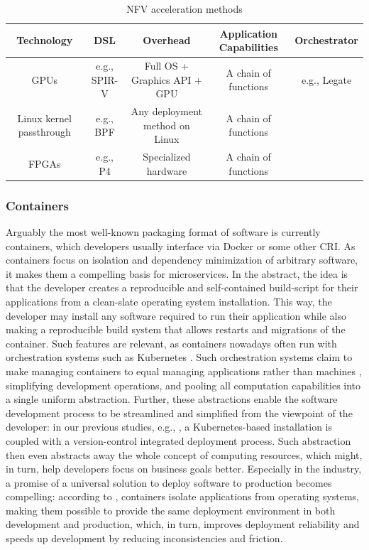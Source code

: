 \documentclass{IEEEtran}
\begin{document}
\begin{table}
\begin{center}
\caption{NFV acceleration methods}
\begin{tabular}{ c|c|c|c|c } 
 Technology & DSL & Overhead & Application Capabilities & Orchestrator \\
 \hline
 GPUs & e.g., SPIR-V & Full OS + Graphics API + GPU & A chain of functions & e.g., Legate \cite{bauer2019legate} \\
 Linux kernel passthrough & e.g., BPF & Any deployment method on Linux & A chain of functions &  \\
 FPGAs & e.g., P4 & Specialized hardware & A chain of functions & \\
\end{tabular}
\end{center}
\end{table}

\subsubsection{Containers}

Arguably the most well-known packaging format of software is currently containers, which developers usually interface via Docker or some other \gls{CRI}. As containers focus on isolation and dependency minimization of arbitrary software, it makes them a compelling basis for microservices. In the abstract, the idea is that the developer creates a reproducible and self-contained build-script for their applications from a clean-slate operating system installation. This way, the developer may install any software required to run their application while also making a reproducible build system that allows restarts and migrations of the container. Such features are relevant, as containers nowadays often run with orchestration systems such as Kubernetes \cite{burns2016borg}. Such orchestration systems claim to make managing containers to equal managing applications rather than machines \cite{burns2016borg}, simplifying development operations, and pooling all computation capabilities into a single uniform abstraction. Further, these abstractions enable the software development process to be streamlined and simplified from the viewpoint of the developer: in our previous studies, e.g., \cite{haavisto2019open}, a Kubernetes-based installation is coupled with a version-control integrated deployment process. Such abstraction then even abstracts away the whole concept of computing resources, which might, in turn, help developers focus on business goals better. Especially in the industry, a promise of a universal solution to deploy software to production becomes compelling: according to \cite{burns2016borg}, containers isolate applications from operating systems, making them possible to provide the same deployment environment in both development and production, which, in turn, improves deployment reliability and speeds up development by reducing inconsistencies and friction.
\end{document}
